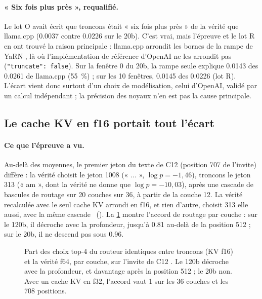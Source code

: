 \paragraph{« Six fois plus près », requalifié.} Le lot O avait écrit que troncons était « six fois plus près » de la vérité que llama.cpp (\num{0.0037} contre \num{0.0226} sur le 20b). C'est vrai, mais l'épreuve et le lot R en ont trouvé la raison principale : llama.cpp arrondit les bornes de la rampe de YaRN \cite{peng2023yarn}, là où l'implémentation de référence d'OpenAI \cite{openai2025gptossref} ne les arrondit pas (\texttt{"truncate": false}). Sur la fenêtre 0 du 20b, la rampe seule explique \num{0.0143} des \num{0.0261} de llama.cpp (\SI{55}{\percent}) ; sur les 10 fenêtres, \num{0.0145} des \num{0.0226} (lot R). L'écart vient donc surtout d'un choix de modélisation, celui d'OpenAI, validé par un calcul indépendant ; la précision des noyaux n'en est pas la cause principale.

\subsection{Le cache KV en f16 portait tout l'écart}\label{t2res-sec:kv}

\paragraph{Ce que l'épreuve a vu.} Au-delà des moyennes, le premier jeton du texte de C12 (position 707 de l'invite) diffère : la vérité choisit le jeton 1008 (« ... », $\log p = -1{,}46$), troncons le jeton 313 (« am », dont la vérité ne donne que $\log p = -10{,}03$), après une cascade de bascules de routage sur 20 couches sur 36, à partir de la couche 12. La vérité recalculée avec le seul cache KV arrondi en f16, et rien d'autre, choisit 313 elle aussi, avec la même cascade \mes~(). La \cref{t2res-fig:routage} montre l'accord de routage par couche : sur le 120b, il décroche avec la profondeur, jusqu'à \num{0.81} au-delà de la position 512 ; sur le 20b, il ne descend pas sous \num{0.96}.

\begin{figure}[ht]
\centering
\GrapheResRoutage
\caption[Accord de routage avec la vérité, par couche]{Part des choix top-4 du routeur identiques entre troncons (KV f16) et la vérité f64, par couche, sur l'invite de C12 \mes. Le 120b décroche avec la profondeur, et davantage après la position 512 ; le 20b non. Avec un cache KV en f32, l'accord vaut 1 sur les 36 couches et les 708 positions.}
\label{t2res-fig:routage}
\end{figure}

